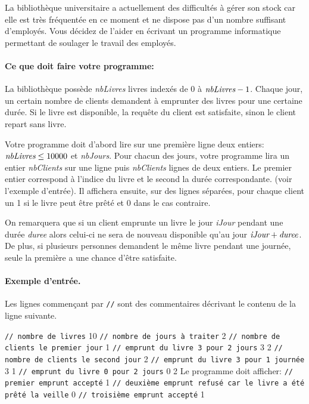 
La bibliothèque universitaire a actuellement des difficultés à gérer
son stock car elle est très fréquentée en ce moment et ne dispose pas
d'un nombre suffisant d'employés. Vous décidez de l'aider en écrivant
un programme informatique permettant de soulager le travail des
employés.

\paragraph{Ce que doit faire votre programme:}
La bibliothèque possède \textit{nbLivres} livres indexés de 0 à
\(\text{\it nbLivres} - 1\). Chaque jour, un certain nombre de clients
demandent à emprunter des livres pour une certaine durée. Si le livre
est disponible, la requête du client est satisfaite, sinon le client
repart sans livre.

Votre programme doit d'abord lire sur une première ligne deux entiers:
\(\text{\it nbLivres} \le 10000\) et \textit{nbJours}. Pour chacun des
jours, votre programme lira un entier \textit{nbClients} sur une ligne puis
\textit{nbClients} lignes de deux entiers. Le premier entier correspond à
l'indice du livre et le second la durée correspondante. (voir
l'exemple d'entrée). Il affichera ensuite, sur des lignes séparées,
pour chaque client un 1 si le livre peut être prêté et 0 dans le cas
contraire.

On remarquera que si un client emprunte un livre le jour
\textit{iJour} pendant une durée \textit{duree} alors celui-ci ne sera
de nouveau disponible qu'au jour \(\text{\it iJour} + \text{\it
  duree}\). De plus, si plusieurs personnes demandent le même livre
pendant une journée, seule la première a une chance d'être satisfaite.

\paragraph{Exemple d'entrée.} Les lignes commen\c cant par \texttt{//}
sont des commentaires décrivant le contenu de la ligne suivante.

{\obeylines
\texttt{// nombre de livres}
10
\texttt{// nombre de jours à traiter}
2
\texttt{// nombre de clients le premier jour}
1
\texttt{// emprunt du livre 3 pour 2 jours}
3 2
\texttt{// nombre de clients le second jour}
2
\texttt{// emprunt du livre 3 pour 1 journée}
3 1
\texttt{// emprunt du livre 0 pour 2 jours}
0 2
}
Le programme doit afficher:
{\obeylines
\texttt{// premier emprunt accepté}
1
\texttt{// deuxième emprunt refusé car le livre a été prêté la veille}
0
\texttt{// troisième emprunt accepté}
1
}

